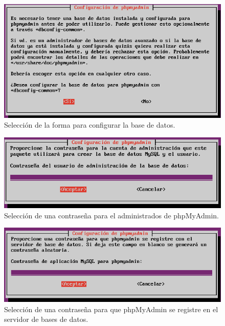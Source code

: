 \begin{figure}[H]
    \begin{center}
        \includegraphics[scale=0.5]{imagenes/img31}
        \caption{Selección de la forma para configurar la base de datos.}
        \label{fig28}
    \end{center}
\end{figure}

\begin{figure}[H]
    \begin{center}
        \includegraphics[scale=0.5]{imagenes/img32}
        \caption{Selección de una contraseña para el administrados de phpMyAdmin.}
        \label{fig29}
    \end{center}
\end{figure}

\begin{figure}[H]
    \begin{center}
        \includegraphics[scale=0.5]{imagenes/img33}
        \caption{Selección de una contraseña para que phpMyAdmin se registre en el servidor de bases de datos.}
        \label{fig30}
    \end{center}
\end{figure}

